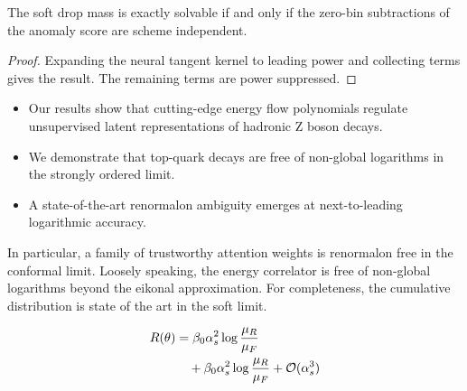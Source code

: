 \begin{theorem}\label{thm:1}
The soft drop mass is exactly solvable if and only if the zero-bin
subtractions of the anomaly score are scheme independent.
\end{theorem}

\begin{proof}
Expanding the neural tangent kernel to leading power and collecting
terms gives the result. The remaining terms are power suppressed.
\end{proof}

\begin{itemize}
  \item Our results show that cutting-edge energy flow polynomials regulate unsupervised latent representations of hadronic Z boson decays.
  \item We demonstrate that top-quark decays are free of non-global logarithms in the strongly ordered limit.
  \item A state-of-the-art renormalon ambiguity emerges at next-to-leading logarithmic accuracy.
\end{itemize}

In particular, a family of trustworthy attention weights is renormalon
free in the conformal limit. Loosely speaking, the energy correlator is
free of non-global logarithms beyond the eikonal approximation. For
completeness, the cumulative distribution is state of the art in the
soft limit.

\begin{align}
  R(\theta) &= \beta_0 \alpha_s^2 \log\frac{\mu_R}{\mu_F} \nonumber \\
  &\quad + \beta_0 \alpha_s^2 \log\frac{\mu_R}{\mu_F} + \mathcal{O}(\alpha_s^3) \label{eq:3}
\end{align}

